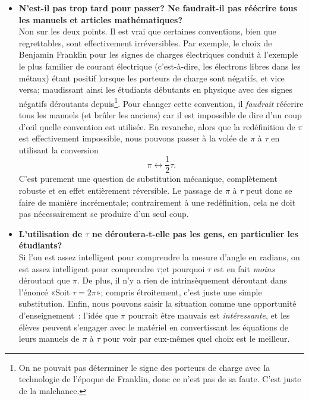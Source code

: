 \begin{itemize}
  \item \textbf{N'est-il pas trop tard pour passer\ns? Ne faudrait-il pas
  réécrire tous les manuels et articles mathématiques\ns?} \\ Non sur les deux
  points. Il est vrai que certaines conventions, bien que regrettables, sont
  effectivement irréversibles. Par exemple, le choix de Benjamin Franklin pour
  les signes de charges électriques conduit à l'exemple le plus familier de
  courant électrique (c'est-à-dire, les électrons libres dans les métaux) étant
  positif lorsque les porteurs de charge sont négatifs, et vice
  versa\ns; maudissant ainsi les étudiants débutants en physique avec des signes
  négatifs déroutants depuis\ns\footnote{On ne pouvait pas déterminer le signe
  des porteurs de charge avec la technologie de l'époque de Franklin, donc ce
  n'est pas de sa faute. C'est juste de la malchance.}. Pour changer cette
  convention, il \emph{faudrait} réécrire tous les manuels (et brûler les
  anciens) car il est impossible de dire d'un coup d'œil quelle convention est
  utilisée. En revanche, alors que la redéfinition de $\pi$ est effectivement
  impossible, nous pouvons passer à la volée de $\pi$ à $\tau$ en utilisant la
  conversion \[ \pi \leftrightarrow \textstyle{\frac{1}{2}}\tau. \] C'est
  purement une question de substitution mécanique, complètement robuste et en
  effet entièrement réversible. Le passage de $\pi$ à $\tau$ peut donc se faire
  de manière incrémentale\ns; contrairement à une redéfinition, cela ne doit pas
  nécessairement se produire d'un seul coup.

  \item \textbf{L'utilisation de $\tau$ ne déroutera-t-elle pas les gens, en
  particulier les étudiants\ns?} \\ Si l'on est assez intelligent pour
  comprendre la mesure d'angle en radians, on est assez intelligent pour
  comprendre $\tau$\ns;et pourquoi $\tau$ est en fait \emph{moins} déroutant que
  $\pi$. De plus, il n'y a rien de intrinsèquement déroutant dans l'énoncé
  «\ns Soit $\tau=2\pi$\ns »\ns; compris étroitement, c'est juste une simple
  substitution. Enfin, nous pouvons saisir la situation comme une opportunité
  d'enseignement~: l'idée que $\pi$ pourrait être mauvais est
  \emph{intéressante}, et les élèves peuvent s'engager avec le matériel en
  convertissant les équations de leurs manuels de $\pi$ à $\tau$ pour voir par
  eux-mêmes quel choix est le meilleur.


\end{itemize}
